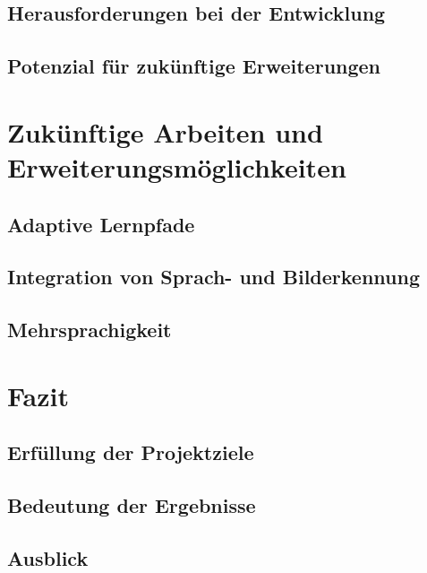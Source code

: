 \documentclass[a4paper,12pt]{article}
\begin{document}
\subsection{Herausforderungen bei der Entwicklung}
\subsection{Potenzial für zukünftige Erweiterungen}

\newpage

\section{Zukünftige Arbeiten und Erweiterungsmöglichkeiten}
\subsection{Adaptive Lernpfade}
\subsection{Integration von Sprach- und Bilderkennung}
\subsection{Mehrsprachigkeit}

\newpage

\section{Fazit}
\subsection{Erfüllung der Projektziele}
\subsection{Bedeutung der Ergebnisse}
\subsection{Ausblick}


\newpage
\nocite{*}
\printbibliography
\end{document}

